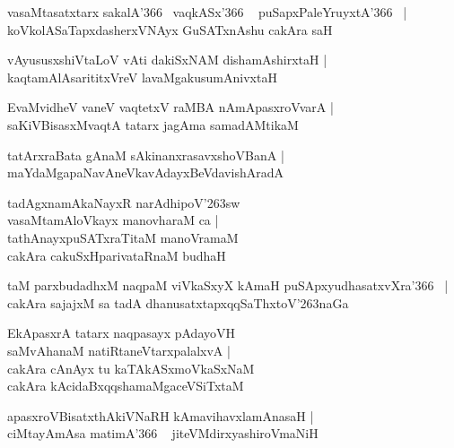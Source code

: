 \documentclass[twoside,12pt,openright]{book}
\def\S{\char'263}
\newcounter{shloka}[chapter]
\begin{document}
\begin{shloka}%
vasaMtasatxtarx sakalA\char'366 ~vaqkASx\char'366 ~ puSapxPaleYruyxtA\char'366 ~|\\
koVkolASaTapxdasherxVNAyx GuSATxnAshu cakAra saH 
\end{shloka}

\begin{shloka}%
vAyususxshiVtaLoV vAti dakiSxNAM dishamAshirxtaH |\\
kaqtamAlAsarititxVreV lavaMgakusumAnivxtaH
\end{shloka}

\begin{shloka}%
EvaMvidheV vaneV vaqtetxV raMBA nAmApasxroVvarA |\\
saKiVBisasxMvaqtA tatarx jagAma samadAMtikaM
\end{shloka}

\begin{shloka}%
tatArxraBata gAnaM sAkinanxrasavxshoVBanA |\\
maYdaMgapaNavAneVkavAdayxBeVdavishAradA 
\end{shloka}

\begin{shloka}%
tadAgxnamAkaNayxR narAdhipoV\S sw\\
vasaMtamAloVkayx manovharaM ca |\\
tathAnayxpuSATxraTitaM manoVramaM \\
cakAra cakuSxHparivataRnaM budhaH
\end{shloka}

\begin{shloka}%
taM parxbudadhxM naqpaM viVkaSxyX kAmaH puSApxyudhasatxvXra\char'366 ~|\\
cakAra sajajxM sa tadA dhanusatxtapxqqSaThxtoV\S naGa
\end{shloka}

\begin{shloka}%
EkApasxrA tatarx naqpasayx pAdayoVH \\
saMvAhanaM natiRtaneVtarxpalalxvA |\\
cakAra cAnAyx tu kaTAkASxmoVkaSxNaM \\
cakAra kAcidaBxqqshamaMgaceVSiTxtaM 
\end{shloka}

\begin{shloka}%
apasxroVBisatxthAkiVNaRH kAmavihavxlamAnasaH |\\
ciMtayAmAsa matimA\char'366 ~ jiteVMdirxyashiroVmaNiH 
\end{shloka}
\end{document}
